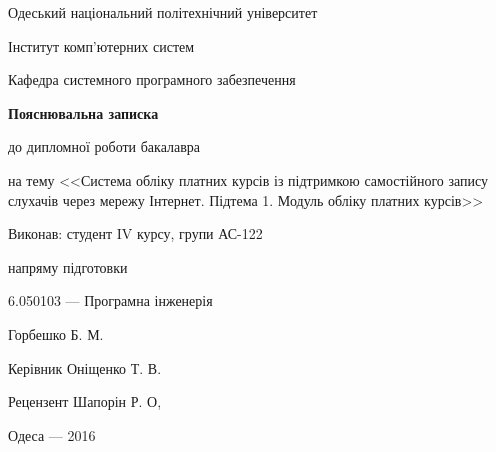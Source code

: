\documentclass[a4paper,14pt]{article}
\begin{document}

\pagestyle{empty}

\begin{center}
Одеський національний політехнічний університет

Інститут комп'ютерних систем

Кафедра системного програмного забезпечення
\vspace{55mm}

\textbf{Пояснювальна записка}

до дипломної роботи бакалавра

на тему <<Система обліку платних курсів із підтримкою самостійного запису слухачів через мережу Інтернет. Підтема 1. Модуль обліку платних курсів>>
\end{center}
\vspace{4cm}
\begin{flushright}
\begin{minipage}{9cm}
Виконав: студент IV курсу, групи АС-122

напряму підготовки

6.050103 --- Програмна інженерія

Горбешко Б. М.

Керівник Оніщенко Т. В.

Рецензент Шапорін Р. О,
\end{minipage}
\end{flushright}
\vspace{45mm}
\begin{center}Одеса --- 2016\end{center}
\newpage


\newpage
\makeatletter\renewcommand{\@oddhead}{\hfil\thepage}\makeatother

\def\contentsname{ЗМІСТ}
\tableofcontents
\newpage













\end{document}
